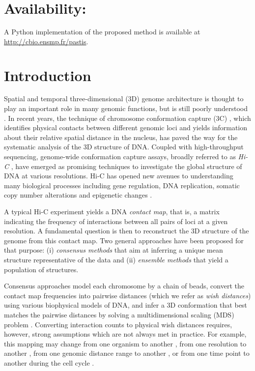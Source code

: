 \section{Availability:} A Python implementation of the proposed method
is available at \href{http://cbio.ensmp.fr/pastis}{http://cbio.ensmp.fr/pastis}.


\section{Introduction}

Spatial and temporal three-dimensional (3D) genome architecture is
thought to play an important role in many genomic functions, but is
still poorly understood \citep{vansteensel:genomics}. In recent years, the
technique of chromosome conformation capture (3C)
\citep{dekker:capturing}, which identifies physical contacts between
different genomic loci and yields information about their relative
spatial distance in the nucleus, has paved the way for the systematic
analysis of the 3D structure of DNA. Coupled with high-throughput
sequencing, genome-wide conformation capture assays, broadly referred
to as {\em Hi-C} \citep{lieberman-aiden:comprehensive}, have emerged
as promising techniques to investigate the global structure of DNA at
various resolutions. Hi-C has opened new avenues to understanding many
biological processes including gene regulation, DNA replication,
somatic copy number alterations and epigenetic changes
\citep{shen:map,ryba:evolutionarily, de:DNA, dixon:topological}.

A typical Hi-C experiment yields a DNA {\em contact map}, that is, a
matrix indicating the frequency of interactions between all pairs of
loci at a given resolution.  A fundamental question is then to
reconstruct the 3D structure of the genome from this contact map. Two
general approaches have been proposed for that purpose: (i)
\emph{consensus methods} that aim at inferring a unique mean structure
representative of the data and (ii) \emph{ensemble methods} that
yield a population of structures.

Consensus approaches \citep{duan:three,
  tanizawa:mapping, bau:three-dimensional} model each
chromosome by a chain of beads, convert the contact map frequencies
into pairwise distances (which we refer as \emph{wish
  distances}) using various biophysical models of DNA, and infer a 3D
conformation that best matches the pairwise distances by solving a
multidimensional scaling (MDS) problem
\citep{kruskal:multidimensional2}. Converting interaction counts to
physical wish distances requires, however, strong assumptions which
are not always met in practice. For example, this mapping may change
from one organism to another \citep{fudenberg:higher-order}, from one
resolution to another \citep{zhang:inference}, from one genomic distance 
range to another \citep{ay:statistical}, or from one time point to 
another during the cell cycle \citep{le:high-resolution, ay:three-dimensional}.

